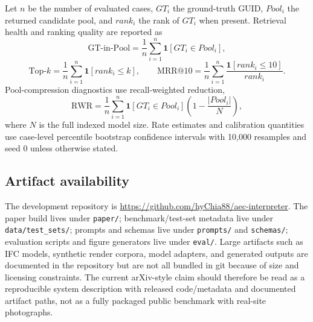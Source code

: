 Let $n$ be the number of evaluated cases, $GT_i$ the ground-truth GUID, $Pool_i$ the returned candidate pool, and $rank_i$ the rank of $GT_i$ when present. Retrieval health and ranking quality are reported as
\[
\mathrm{GT\mbox{-}in\mbox{-}Pool}=\frac{1}{n}\sum_{i=1}^{n}\mathbf{1}[GT_i \in Pool_i],
\]
\[
\mathrm{Top}\mbox{-}k=\frac{1}{n}\sum_{i=1}^{n}\mathbf{1}[rank_i\le k],
\qquad
\mathrm{MRR@10}=\frac{1}{n}\sum_{i=1}^{n}\frac{\mathbf{1}[rank_i\le10]}{rank_i}.
\]
Pool-compression diagnostics use recall-weighted reduction,
\[
\mathrm{RWR}=\frac{1}{n}\sum_{i=1}^{n}\mathbf{1}[GT_i\in Pool_i]\left(1-\frac{|Pool_i|}{N}\right),
\]
where $N$ is the full indexed model size. Rate estimates and calibration quantities use case-level percentile bootstrap confidence intervals with 10,000 resamples and seed 0 unless otherwise stated.

\subsection{Artifact availability}
\label{app:artifacts}

The development repository is \url{https://github.com/hyChia88/aec-interpreter}. The paper build lives under \texttt{paper/}; benchmark/test-set metadata live under \texttt{data/test\_sets/}; prompts and schemas live under \texttt{prompts/} and \texttt{schemas/}; evaluation scripts and figure generators live under \texttt{eval/}. Large artifacts such as IFC models, synthetic render corpora, model adapters, and generated outputs are documented in the repository but are not all bundled in git because of size and licensing constraints. The current arXiv-style claim should therefore be read as a reproducible system description with released code/metadata and documented artifact paths, not as a fully packaged public benchmark with real-site photographs.
